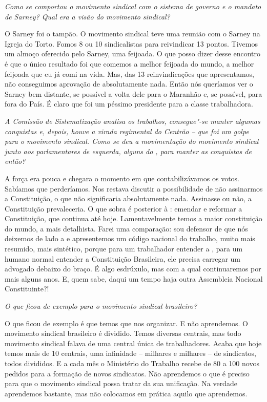 \medskip

\noindent\emph{Como se comportou o movimento sindical com o sistema de governo
e o mandato de Sarney? Qual era a visão do movimento sindical?}

O Sarney foi o tampão. O movimento sindical teve
uma reunião com o Sarney na Igreja do Torto. Fomos 8 ou 10 sindicalistas
para reivindicar 13 pontos. Tivemos um almoço oferecido pelo Sarney, uma
feijoada. O que posso dizer desse encontro é que o único resultado foi
que comemos a melhor feijoada do mundo, a melhor feijoada que eu já comi
na vida. Mas, das 13 reinvindicações que apresentamos, não conseguimos
aprovação de absolutamente nada. Então nós queríamos ver o Sarney bem
distante, se possível a volta dele para o Maranhão e, se possível, para
fora do País. É claro que foi um péssimo presidente para a classe
trabalhadora.

\medskip

\noindent\emph{A Comissão de Sistematização analisa os trabalhos, consegue"-se
manter algumas conquistas e, depois, houve a virada regimental do
Centrão -- que foi um golpe para o movimento sindical. Como se deu a
movimentação do movimento sindical junto aos parlamentares de esquerda,
alguns do , para manter as conquistas de então?}

A força era pouca e chegara o momento em que
contabilizávamos os votos. Sabíamos que perderíamos. Nos restava
discutir a possibilidade de não assinarmos a Constituição, o que não
significaria absolutamente nada. Assinasse ou não, a Constituição
prevaleceria. O que sobra é posterior à : emendar e reformar a
Constituição, que continua até hoje. Lamentavelmente temos a maior
constituição do mundo, a mais detalhista. Farei uma comparação: sou
defensor de que nós deixemos de lado a  e apresentemos um código
nacional do trabalho, muito mais resumido, mais sintético, porque para
um trabalhador entender a , para um humano normal entender a
Constituição Brasileira, ele precisa carregar um advogado debaixo do
braço. É algo esdrúxulo, mas com a qual continuaremos por mais alguns
anos. E, quem sabe, daqui um tempo haja outra Assembleia Nacional
Constituinte?!

\medskip

\noindent\emph{O que ficou de exemplo para o movimento sindical brasileiro?}

O que ficou de exemplo é que temos que nos
organizar. E não aprendemos. O movimento sindical brasileiro é dividido.
Temos diversas centrais, mas todo movimento sindical falava de uma
central única de trabalhadores. Acaba que hoje temos mais de 10
centrais, uma infinidade -- milhares e milhares -- de sindicatos, todos
divididos. E a cada mês o Ministério do Trabalho recebe de 80 a 100
novos pedidos para a formação de novos sindicatos. Não aprendemos o que
é preciso para que o movimento sindical possa tratar da sua unificação.
Na verdade aprendemos bastante, mas não colocamos em prática aquilo que
aprendemos.

